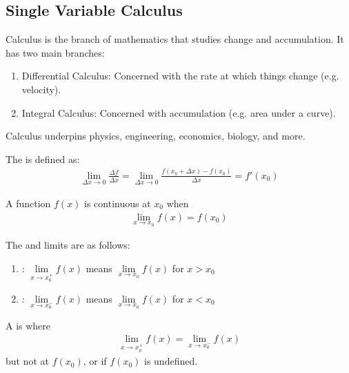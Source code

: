 \subsection{Single Variable Calculus}

Calculus is the branch of mathematics that studies change and accumulation. It has two main branches:
\begin{enumerate}[label=\roman*.]
\setlength{\itemsep}{0pt}
\item Differential Calculus: Concerned with the rate at which things change (e.g. velocity).
\item Integral Calculus: Concerned with accumulation (e.g. area under a curve).
\end{enumerate}
Calculus underpins physics, engineering, economics, biology, and more.

\begin{definition} The  is defined as:
\begin{align*}
\lim_{\Delta x \rightarrow 0} \frac{\Delta f}{\Delta x} = \lim_{\Delta x \rightarrow 0} \frac{f(x_0 + \Delta x) - f(x_0)}{\Delta x} = f'(x_0) \nonumber
\end{align*}
\end{definition}

\begin{definition} A function $f(x)$ is continuous at $x_0$ when
\begin{align}
\lim_{x \rightarrow x_0} f(x) = f(x_0) \nonumber
\end{align}
\end{definition}

\begin{definition} The  and  limits are as follows:
\begin{enumerate}[label=\roman*.]
\setlength{\itemsep}{0pt}
\item {}: $\lim\limits_{x \rightarrow x^+_0} f(x)$ means $\lim\limits_{x \rightarrow x_0} f(x)$ for $x > x_0$
\item {}: $\lim\limits_{x \rightarrow x^-_0} f(x)$ means $\lim\limits_{x \rightarrow x_0} f(x)$ for $x < x_0$
\end{enumerate}
\end{definition}

\begin{definition} A  is where
\begin{align}
\lim\limits_{x \rightarrow x^+_0} f(x) = \lim\limits_{x \rightarrow x^-_0} f(x) \nonumber
\end{align}
but not at $f(x_0)$, or if $f(x_0)$ is undefined.
\end{definition}

